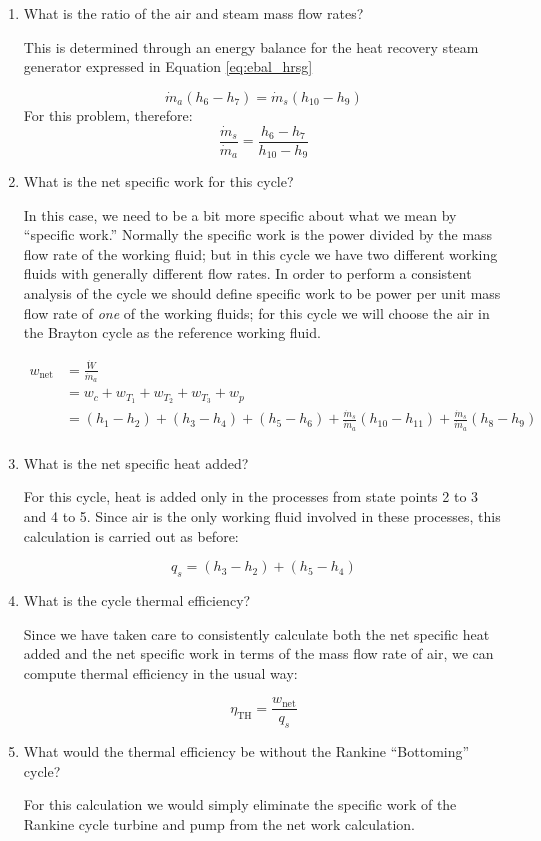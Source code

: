 \begin{enumerate}
\item What is the ratio of the air and steam mass flow rates?

This is determined through an energy balance for the heat recovery steam generator expressed in Equation \ref{eq:ebal_hrsg}

\begin{equation}
\dot{m}_a (h_6 - h_7) = \dot{m}_s (h_{10}-h_9)
\label{eq:ebal_hrsg}
\end{equation}
For this problem, therefore:
$$ \frac{\dot{m}_s}{\dot{m}_a} = \frac{h_6 - h_7}{h_{10}-h_9}$$

\item What is the net specific work for this cycle?

In this case, we need to be a bit more specific about what we mean by ``specific work.'' Normally the specific work is the power divided by the mass flow rate of the working fluid; but in this cycle we have two different working fluids with generally different flow rates.  In order to perform a consistent analysis of the cycle we should define specific work to be power per unit mass flow rate of \emph{one} of the working fluids; for this cycle we will choose the air in the Brayton cycle as the reference working fluid.

\begin{align*}
w_{\text{net}} &= \frac{\dot{W}}{\dot{m}_a} \\
               &= w_c + w_{T_1} + w_{T_2} + w_{T_3} + w_p \\
&=(h_1 - h_2) + (h_3 - h_4) + (h_5 - h_6) + \frac{\dot{m}_s}{\dot{m}_a}(h_{10}-h_{11}) + \frac{\dot{m}_s}{\dot{m}_a}(h_8 - h_9)\\ 
\end{align*}

\item What is the net specific heat added?

For this cycle, heat is added only in the processes from state points 2 to 3 and 4 to 5.  Since air is the only working fluid involved in these processes, this calculation is carried out as before:

$$q_s = (h_3 - h_2) + (h_5 - h_4)$$

\item What is the cycle thermal efficiency?

Since we have taken care to consistently calculate both the net specific heat added and the net specific work in terms of the mass flow rate of air, we can compute thermal efficiency in the usual way:

$$\eta_{\text{TH}} = \frac{w_{\text{net}}}{q_s}$$

\item What would the thermal efficiency be without the Rankine ``Bottoming'' cycle?

For this calculation we would simply eliminate the specific work of the Rankine cycle turbine and pump from the net work calculation.

\end{enumerate}
